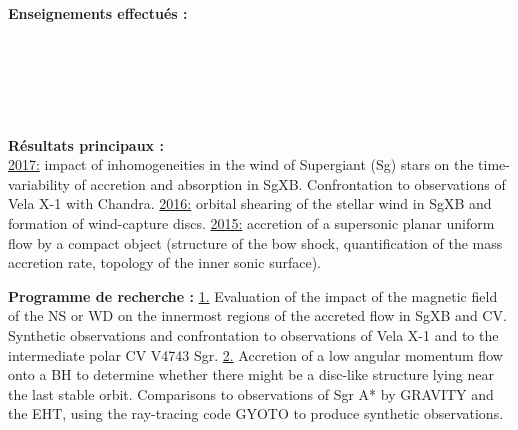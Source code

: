 \documentclass[11pt]{article}
\begin{document}
{\bf Enseignements effectu\'es :}\\
    \\
    \\ 
    \\ 
    \\ 
   \\ 

\vspace{-0.1cm}

{\bf R\'esultats principaux :} \\
\underline{2017:} impact of inhomogeneities in the wind of Supergiant (Sg) stars on the time-variability of accretion and absorption in SgXB. Confrontation to observations of Vela X-1 with Chandra. \underline{2016:} orbital shearing of the stellar wind in SgXB and formation of wind-capture discs. \underline{2015:} accretion of a supersonic planar uniform flow by a compact object (structure of the bow shock, quantification of the mass accretion rate, topology of the inner sonic surface).\\

\vspace{-0.1cm}

{\bf Programme de recherche :}  
\underline{1.} Evaluation of the impact of the magnetic field of the NS or WD on the innermost regions of the accreted flow in SgXB and CV. Synthetic observations and confrontation to observations of Vela X-1 and to the intermediate polar CV V4743 Sgr. \underline{2.} Accretion of a low angular momentum flow onto a BH to determine whether there might be a disc-like structure lying near the last stable orbit. Comparisons to observations of Sgr A* by GRAVITY and the EHT, using the ray-tracing code GYOTO to produce synthetic observations.\\
\end{document}

